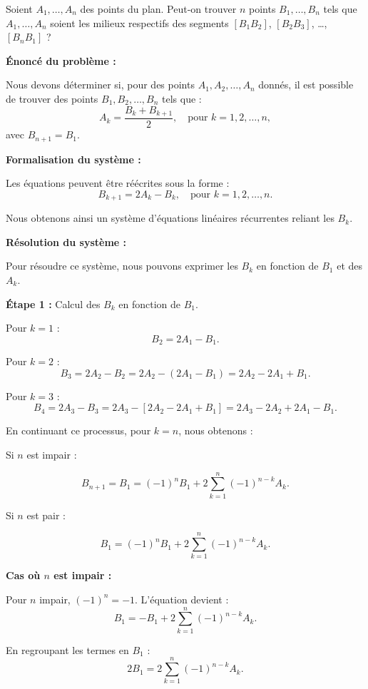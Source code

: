 \documentclass[a4paper,12pt]{article}
\begin{document}
\begin{tcolorbox}[title={Exercice 13 - {[}Chercher, Représenter{]}}]
Soient \( A_1, \dots, A_n \) des points du plan. Peut-on trouver \( n \) points \( B_1, \dots, B_n \) tels que \( A_1, \dots, A_n \) soient les milieux respectifs des segments \([B_1B_2]\), \([B_2B_3]\), \dots, \([B_nB_1]\) ?
\end{tcolorbox}

\begin{solutionbox}
\textbf{Énoncé du problème :}

Nous devons déterminer si, pour des points \( A_1, A_2, \dots, A_n \) donnés, il est possible de trouver des points \( B_1, B_2, \dots, B_n \) tels que :
\[
A_k = \dfrac{B_k + B_{k+1}}{2}, \quad \text{pour } k = 1, 2, \dots, n,
\]
avec \( B_{n+1} = B_1 \).

\textbf{Formalisation du système :}

Les équations peuvent être réécrites sous la forme :
\[
B_{k+1} = 2A_k - B_k, \quad \text{pour } k = 1, 2, \dots, n.
\]

Nous obtenons ainsi un système d'équations linéaires récurrentes reliant les \( B_k \).

\textbf{Résolution du système :}

Pour résoudre ce système, nous pouvons exprimer les \( B_k \) en fonction de \( B_1 \) et des \( A_k \).

\textbf{Étape 1 :} Calcul des \( B_k \) en fonction de \( B_1 \).

Pour \( k = 1 \) :
\[
B_2 = 2A_1 - B_1.
\]

Pour \( k = 2 \) :
\[
B_3 = 2A_2 - B_2 = 2A_2 - (2A_1 - B_1) = 2A_2 - 2A_1 + B_1.
\]

Pour \( k = 3 \) :
\[
B_4 = 2A_3 - B_3 = 2A_3 - [2A_2 - 2A_1 + B_1] = 2A_3 - 2A_2 + 2A_1 - B_1.
\]

En continuant ce processus, pour \( k = n \), nous obtenons :

Si \( n \) est impair :

\[
B_{n+1} = B_1 = (-1)^n B_1 + 2 \sum_{k=1}^{n} (-1)^{n-k} A_k.
\]

Si \( n \) est pair :

\[
B_1 = (-1)^n B_1 + 2 \sum_{k=1}^{n} (-1)^{n-k} A_k.
\]

\textbf{Cas où \( n \) est impair :}

Pour \( n \) impair, \( (-1)^n = -1 \). L'équation devient :
\[
B_1 = -B_1 + 2 \sum_{k=1}^{n} (-1)^{n-k} A_k.
\]

En regroupant les termes en \( B_1 \) :
\[
2B_1 = 2 \sum_{k=1}^{n} (-1)^{n-k} A_k.
\]


\end{solutionbox}
\end{document}
